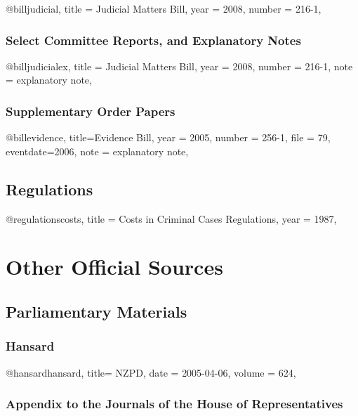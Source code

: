 \documentclass{book}
\begin{document}
\begin{bib}
@bill{judicial,
title = {Judicial Matters Bill},
year = {2008},
number = {216-1},
}
\end{bib}

\subsection{Select Committee Reports, and Explanatory  Notes}
\begin{bib}
@bill{judicialex,
title = {Judicial Matters Bill},
year = {2008},
number = {216-1},
note = {explanatory note},
}
\end{bib}


\subsection{Supplementary Order Papers}
\begin{bib}
@bill{evidence,
title={Evidence Bill},
year = {2005},
number = {256-1},
file = {79},
eventdate={2006},
note = {explanatory note},
}
\end{bib}

\section{Regulations}

\begin{bib}
@regulations{costs,
title = {Costs in Criminal Cases Regulations},
year = {1987},
}
\end{bib}


\chapter{Other Official Sources}

\section{Parliamentary Materials}

\subsection{Hansard}

\begin{bib}
@hansard{hansard,
title= {NZPD},
date = {2005-04-06},
volume = {624},
}
\end{bib}

\subsection{Appendix to the Journals of the House of Representatives}
\end{document}
